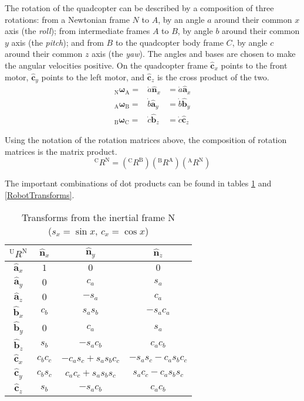 \documentclass[lettersize,journal]{IEEEtran}
\begin{document}
The rotation of the quadcopter can be described by a composition of three rotations: from a Newtonian frame $N$ to $A$, by an angle $a$ around their common $x$ axis (the \emph{roll}); from intermediate frames $A$ to $B$, by angle $b$ around their common $y$ axis (the \emph{pitch}); and from $B$ to the quadcopter body frame $C$, by angle $c$ around their common $z$ axis (the \emph{yaw}). The angles and bases are chosen to make the angular velocities positive. On the quadcopter frame $\mathbf{\hat{c}}_x$ points to the front motor, $\mathbf{\hat{c}}_y$ points to the left motor, and $\mathbf{\hat{c}}_z$ is the cross product of the two.
\begin{eqnarray}
  {_\mathrm{N}\boldsymbol\omega_\mathrm{A}} =& \dot{a} \mathbf{\hat{n}}_x &= \dot{a} \mathbf{\hat{a}}_x \label{ARotVel}\\
  {_\mathrm{A}\boldsymbol\omega_\mathrm{B}} =& \dot{b} \mathbf{\hat{a}}_y &= \dot{b} \mathbf{\hat{b}}_y\\
  {_\mathrm{B}\boldsymbol\omega_\mathrm{C}} =& \dot{c} \mathbf{\hat{b}}_z &= \dot{c} \mathbf{\hat{c}}_z \label{CRotVel}
\end{eqnarray}

Using the notation of the rotation matrices above, the composition of rotation matrices is the matrix product.
\begin{equation}
  {^\mathrm{C}R^\mathrm{N}} = \left({^\mathrm{C}R^\mathrm{B}}\right)\left({^\mathrm{B}R^\mathrm{A}}\right)\left({^\mathrm{A}R^\mathrm{N}}\right)
\end{equation}

The important combinations of dot products can be found in tables \ref{InertialTransforms} and \ref{RobotTransforms}. 
\begin{table}[!t] \centering
  \caption{Transforms from the inertial frame $\mathrm{N}$\\($s_x = \sin x$, $c_x = \cos x$)}
  \begin{tabular}{c|ccc}
    $^\mathrm{U}R^\mathrm{N}$ & $\mathbf{\hat{n}}_x$ & $\mathbf{\hat{n}}_y$ & $\mathbf{\hat{n}}_z$ \\
    \hline
    $\mathbf{\hat{a}}_x$ & $1$ & $0$ & $0$\\
    $\mathbf{\hat{a}}_y$ & $0$ & $c_a$ & $s_a$\\
    $\mathbf{\hat{a}}_z$ & $0$ & $-s_a$ & $c_a$\\
    \hline
    $\mathbf{\hat{b}}_x$ & $c_b$ & $s_as_b$ & $-s_ac_a$\\
    $\mathbf{\hat{b}}_y$ & $0$ & $c_a$ & $s_a$\\
    $\mathbf{\hat{b}}_z$ & $s_b$ & $-s_a c_b$ & $c_a c_b$\\
    \hline
    $\mathbf{\hat{c}}_x$ & $c_b c_c$ & $-c_a s_c + s_a s_b c_c$ & $-s_a s_c - c_a s_b c_c$\\
    $\mathbf{\hat{c}}_y$ & $c_b s_c$ & $c_a c_c + s_a s_b s_c$ & $s_a c_c - c_a s_b s_c$\\
    $\mathbf{\hat{c}}_z$ & $s_b$ & $-s_a c_b$ & $c_a c_b$
  \end{tabular} \label{InertialTransforms}
\end{table}
\end{document}
